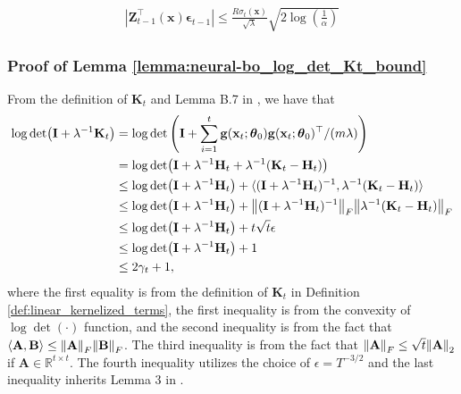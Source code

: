 \begin{equation*}
    \begin{split}
        \left \lvert \mathbf{Z}_{t-1}^\top(\mathbf{x})\boldsymbol{\epsilon}_{t-1} \right \rvert \leq \frac{R\sigma_t(\mathbf{x})}{\sqrt{\lambda}} \sqrt{2 \log(\frac{1}{\alpha})}
    \end{split}
\end{equation*}

\subsubsection{Proof of Lemma \ref{lemma:neural-bo_log_det_Kt_bound}}
\label{log_det_Kt_bound_proof}

From the definition of $\mathbf{K}_t$ and Lemma B.7 in \citet{zhou2020neural}, we have that
\begin{equation*}
\begin{split}
    \log \det(\mathbf{I}+\lambda^{-1}\mathbf{K}_{t})
    & = \log\det \left(\mathbf{I}+\sum_{i=1}^{t}\mathbf{g}({\mathbf{x}_t};\boldsymbol{\theta}_0)\mathbf{g}({\mathbf{x}_t};\boldsymbol{\theta}_0)^\top/(m\lambda)\right) \\
    & = \log \det(\mathbf{I}+\lambda^{-1}\mathbf{H}_t + \lambda^{-1}(\mathbf{K}_t - \mathbf{H}_t))\\
    & \leq \log \det (\mathbf{I}+\lambda^{-1}\mathbf{H}_t)  + \langle (\mathbf{I}+\lambda^{-1}\mathbf{H}_t)^{-1}, \lambda^{-1}(\mathbf{K}_t - \mathbf{H}_t) \rangle \\
    & \leq \log \det (\mathbf{I}+\lambda^{-1}\mathbf{H}_t)  + \norm{(\mathbf{I}+\lambda^{-1}\mathbf{H}_t)^{-1}}_F \norm{ \lambda^{-1}(\mathbf{K}_t - \mathbf{H}_t)}_F \\
    & \leq \log \det (\mathbf{I}+\lambda^{-1}\mathbf{H}_t) + t\sqrt{t} \epsilon \\
    & \leq \log \det (\mathbf{I}+\lambda^{-1}\mathbf{H}_t) + 1 \\
    & \leq 2 \gamma_t + 1, 
\end{split}
\end{equation*}
where the first equality is from the definition of $\mathbf{K}_t$ in Definition \ref{def:linear_kernelized_terms}, the first inequality is from the convexity of $\log \det(\cdot)$ function,
and the second inequality is from the fact that $\langle \mathbf{A}, \mathbf{B} \rangle \le \norm{\mathbf{A}}_F \norm{\mathbf{B}}_F$. The third inequality is
from the fact that $\norm{\mathbf{A}}_F \le \sqrt{t} \norm{\mathbf{A}}_2$ if $\mathbf{A} \in \mathbb{R}^{t \times t}$. The fourth inequality utilizes the choice of $\epsilon = T^{-3/2}$ and the last inequality inherits Lemma 3 in \citet{chowdhury2017kernelized}.


